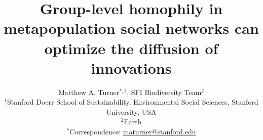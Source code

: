 \documentclass{article}
\theoremstyle{mytheorem}
\theoremstyle{myremark}
\begin{document}
\title{Group-level homophily in metapopulation social networks can optimize the diffusion of innovations}

\author{Matthew A. Turner$^{*,1}$, SFI Biodiversity Team$^{2}$ \\ 
  {\small $^1$Stanford Doerr School of Sustainability,
Environmental Social Sciences, Stanford University, USA \\ \vspace{0.5em}
$^2$Earth} \\ \vspace{0.5em}
{\small $^*$Correspondence: \href{mailto:maturner@stanford.edu}{maturner@stanford.edu}}}
\maketitle
\end{document}

